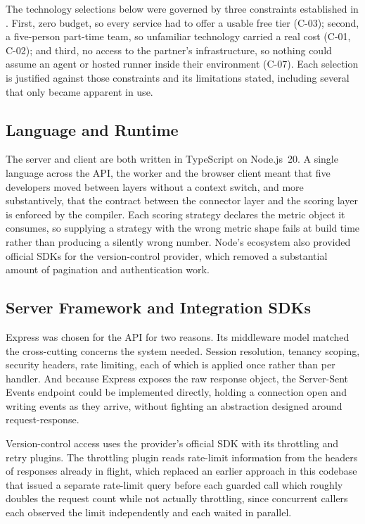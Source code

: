 The technology selections below were governed by three constraints established in
. First, zero budget, so every service had to offer a
usable free tier (C-03); second, a five-person part-time team, so unfamiliar technology
carried a real cost (C-01, C-02); and third, no access to the partner's infrastructure,
so nothing could assume an agent or hosted runner inside their environment
(C-07). Each selection is justified against those constraints and its limitations
stated, including several that only became apparent in use.

\subsection{Language and Runtime}
\label{subsec:tool-runtime}

The server and client are both written in TypeScript on Node.js~20. A single
language across the API, the worker and the browser client meant that five
 developers moved between layers without a context switch, and more
substantively, that the contract between the connector layer and the scoring
layer is enforced by the compiler. Each scoring strategy declares the metric
object it consumes, so supplying a strategy with the wrong metric shape fails at
build time rather than producing a silently wrong number. Node's ecosystem also
provided official SDKs for the version-control provider, which removed a
substantial amount of pagination and authentication work.

\subsection{Server Framework and Integration SDKs}
\label{subsec:tool-server}

Express was chosen for the API for two reasons. Its middleware model matched the
cross-cutting concerns the system needed. Session resolution, tenancy scoping,
security headers, rate limiting, each of which is applied once rather than
per handler. And because Express exposes the raw response object, the
Server-Sent Events endpoint could be implemented directly, holding a connection
open and writing events as they arrive, without fighting an abstraction designed
around request-response.

Version-control access uses the provider's official SDK with its throttling and
retry plugins. The throttling plugin reads rate-limit information from the headers
of responses already in flight, which replaced an earlier approach in this codebase
that issued a separate rate-limit query before each guarded call which roughly
doubles the request count while not actually throttling, since concurrent callers
each observed the limit independently and each waited in parallel.


